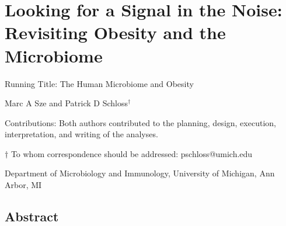 \documentclass[12pt,]{article}
\title{}
\author{}
\date{}
\begin{document}
\maketitle

\section{Looking for a Signal in the Noise: Revisiting Obesity and the
Microbiome}\label{looking-for-a-signal-in-the-noise-revisiting-obesity-and-the-microbiome}

\begin{center}
\vspace{25mm}


Running Title: The Human Microbiome and Obesity

\vspace{10mm}

Marc A Sze and Patrick D Schloss${^\dagger}$

\vspace{10mm}

Contributions: Both authors contributed to the planning, design, execution, interpretation, and writing of the analyses.


\vspace{20mm}

$\dagger$ To whom correspondence should be addressed: pschloss@umich.edu

Department of Microbiology and Immunology, University of Michigan, Ann Arbor, MI
\end{center}

\newpage

\linenumbers

\subsection{Abstract}\label{abstract}
\end{document}
